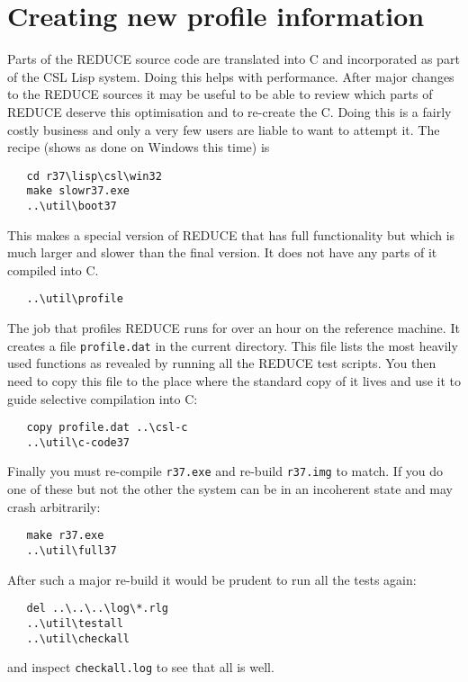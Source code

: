 \documentclass[a4paper,11pt]{article}
\begin{document}
\section{Creating new profile information}
Parts of the REDUCE source code are translated into C and incorporated as
part of the CSL Lisp system. Doing this helps with performance. After
major changes to the REDUCE sources it may be useful to be able to
review which parts of REDUCE deserve this optimisation and to re-create the
C.  Doing this is a fairly costly business and only a very few users are
liable to want to attempt it.  The recipe (shows as done on Windows this
time) is
\begin{verbatim}
   cd r37\lisp\csl\win32
   make slowr37.exe
   ..\util\boot37
\end{verbatim}
\noindent This makes a special version of REDUCE that has full functionality
but which is much larger and slower than the final version. It does not
have any parts of it compiled into C.
\begin{verbatim}
   ..\util\profile
\end{verbatim}
\noindent The job that profiles REDUCE runs for over an hour on the
reference machine. It creates a file \verb+profile.dat+ in the current
directory. This file lists the most heavily used functions as revealed by
running all the REDUCE test scripts.  You then need to copy this file to
the place where the standard copy of it lives and use it to guide
selective compilation into C:
\begin{verbatim}
   copy profile.dat ..\csl-c
   ..\util\c-code37
\end{verbatim}
\noindent Finally you must re-compile \verb+r37.exe+ and re-build \verb+r37.img+ to
match. If you do one of these but not the other the system can be in
an incoherent state and may crash arbitrarily:
\begin{verbatim}
   make r37.exe
   ..\util\full37
\end{verbatim}
\noindent After such a major re-build it would be prudent to run all the
tests again:
\begin{verbatim}
   del ..\..\..\log\*.rlg
   ..\util\testall
   ..\util\checkall
\end{verbatim}
\noindent and inspect \verb+checkall.log+ to see that all is well.
\end{document}
